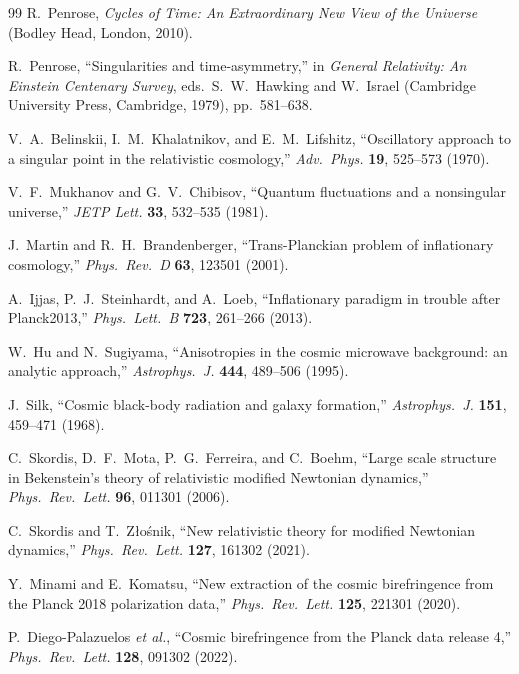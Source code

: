 \documentclass[11pt,a4paper]{article}
\theoremstyle{plain}
\theoremstyle{definition}
\theoremstyle{remark}
\numberwithin{equation}{section}
\begin{document}
\begin{thebibliography}{99}
R.~Penrose, \textit{Cycles of Time: An Extraordinary New View of the Universe} (Bodley Head, London, 2010).

R.~Penrose, ``Singularities and time-asymmetry,'' in \textit{General Relativity: An Einstein Centenary Survey}, eds.\ S.~W.~Hawking and W.~Israel (Cambridge University Press, Cambridge, 1979), pp.\ 581--638.

V.~A.~Belinskii, I.~M.~Khalatnikov, and E.~M.~Lifshitz, ``Oscillatory approach to a singular point in the relativistic cosmology,'' \textit{Adv.\ Phys.} \textbf{19}, 525--573 (1970).

V.~F.~Mukhanov and G.~V.~Chibisov, ``Quantum fluctuations and a nonsingular universe,'' \textit{JETP Lett.} \textbf{33}, 532--535 (1981).

J.~Martin and R.~H.~Brandenberger, ``Trans-Planckian problem of inflationary cosmology,'' \textit{Phys.\ Rev.\ D} \textbf{63}, 123501 (2001).

A.~Ijjas, P.~J.~Steinhardt, and A.~Loeb, ``Inflationary paradigm in trouble after Planck2013,'' \textit{Phys.\ Lett.\ B} \textbf{723}, 261--266 (2013).

W.~Hu and N.~Sugiyama, ``Anisotropies in the cosmic microwave background: an analytic approach,'' \textit{Astrophys.\ J.} \textbf{444}, 489--506 (1995).

J.~Silk, ``Cosmic black-body radiation and galaxy formation,'' \textit{Astrophys.\ J.} \textbf{151}, 459--471 (1968).

C.~Skordis, D.~F.~Mota, P.~G.~Ferreira, and C.~Boehm, ``Large scale structure in Bekenstein's theory of relativistic modified Newtonian dynamics,'' \textit{Phys.\ Rev.\ Lett.} \textbf{96}, 011301 (2006).

C.~Skordis and T.~Z{\l}o\'snik, ``New relativistic theory for modified Newtonian dynamics,'' \textit{Phys.\ Rev.\ Lett.} \textbf{127}, 161302 (2021).

Y.~Minami and E.~Komatsu, ``New extraction of the cosmic birefringence from the Planck 2018 polarization data,'' \textit{Phys.\ Rev.\ Lett.} \textbf{125}, 221301 (2020).

P.~Diego-Palazuelos \textit{et al.}, ``Cosmic birefringence from the Planck data release 4,'' \textit{Phys.\ Rev.\ Lett.} \textbf{128}, 091302 (2022).


\end{thebibliography}
\end{document}
